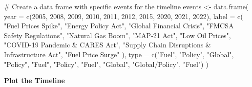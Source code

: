 \documentclass[
  letterpaper,
  DIV=11,
  numbers=noendperiod]{scrreprt}
\newenvironment{Shaded}{\begin{snugshade}}{\end{snugshade}}
\newcommand{\AttributeTok}[1]{\textcolor[rgb]{0.40,0.45,0.13}{#1}}
\newcommand{\CommentTok}[1]{\textcolor[rgb]{0.37,0.37,0.37}{#1}}
\newcommand{\DecValTok}[1]{\textcolor[rgb]{0.68,0.00,0.00}{#1}}
\newcommand{\FunctionTok}[1]{\textcolor[rgb]{0.28,0.35,0.67}{#1}}
\newcommand{\NormalTok}[1]{\textcolor[rgb]{0.00,0.23,0.31}{#1}}
\newcommand{\OtherTok}[1]{\textcolor[rgb]{0.00,0.23,0.31}{#1}}
\newcommand{\StringTok}[1]{\textcolor[rgb]{0.13,0.47,0.30}{#1}}
\begin{document}
\begin{Shaded}
\begin{Highlighting}[]
\CommentTok{\# Create a data frame with specific events for the timeline}
\NormalTok{events }\OtherTok{\textless{}{-}} \FunctionTok{data.frame}\NormalTok{(}
  \AttributeTok{year =} \FunctionTok{c}\NormalTok{(}\DecValTok{2005}\NormalTok{, }\DecValTok{2008}\NormalTok{, }\DecValTok{2009}\NormalTok{, }\DecValTok{2010}\NormalTok{, }\DecValTok{2011}\NormalTok{, }\DecValTok{2012}\NormalTok{, }\DecValTok{2015}\NormalTok{, }\DecValTok{2020}\NormalTok{, }\DecValTok{2021}\NormalTok{, }\DecValTok{2022}\NormalTok{),}
  \AttributeTok{label =} \FunctionTok{c}\NormalTok{(}
    \StringTok{"Fuel Prices Spike"}\NormalTok{,}
    \StringTok{"Energy Policy Act"}\NormalTok{,}
    \StringTok{"Global Financial Crisis"}\NormalTok{,}
    \StringTok{"FMCSA Safety Regulations"}\NormalTok{,}
    \StringTok{"Natural Gas Boom"}\NormalTok{,}
    \StringTok{"MAP{-}21 Act"}\NormalTok{,}
    \StringTok{"Low Oil Prices"}\NormalTok{,}
    \StringTok{"COVID{-}19 Pandemic \& CARES Act"}\NormalTok{,}
    \StringTok{"Supply Chain Disruptions \& Infrastructure Act"}\NormalTok{,}
    \StringTok{"Fuel Price Surge"}
\NormalTok{  ),}
  \AttributeTok{type =} \FunctionTok{c}\NormalTok{(}\StringTok{"Fuel"}\NormalTok{, }\StringTok{"Policy"}\NormalTok{, }\StringTok{"Global"}\NormalTok{, }\StringTok{"Policy"}\NormalTok{, }\StringTok{"Fuel"}\NormalTok{, }\StringTok{"Policy"}\NormalTok{, }\StringTok{"Fuel"}\NormalTok{, }\StringTok{"Global"}\NormalTok{, }\StringTok{"Global/Policy"}\NormalTok{, }\StringTok{"Fuel"}\NormalTok{)}
\NormalTok{)}
\end{Highlighting}
\end{Shaded}

\textbf{Plot the Timeline}
\end{document}
